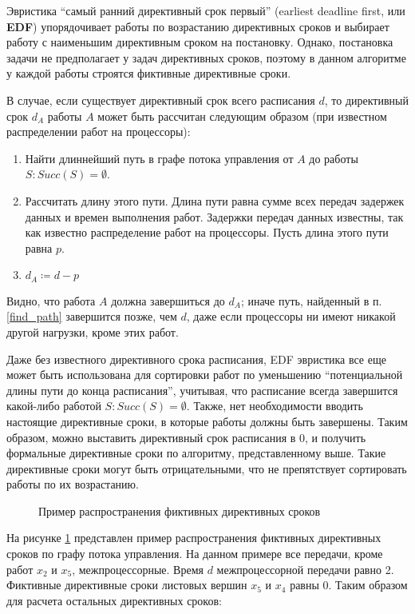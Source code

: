 Эвристика ``самый ранний директивный срок первый'' (earliest deadline first, или \textbf{EDF}) упорядочивает работы по возрастанию директивных сроков и выбирает работу с наименьшим директивным сроком на постановку. Однако, постановка задачи не предполагает у задач директивных сроков, поэтому в данном алгоритме у каждой работы строятся фиктивные директивные сроки.

В случае, если существует директивный срок всего расписания $d$, то директивный срок $d_A$ работы $A$ может быть рассчитан следующим образом (при известном распределении работ на процессоры):
\begin{enumerate}
    \item \label{find_path} Найти длиннейший путь в графе потока управления от $A$ до работы $S: Succ(S) = \emptyset$.
    \item Рассчитать длину этого пути. Длина пути равна сумме всех передач задержек данных и времен выполнения работ. Задержки передач данных известны, так как известно распределение работ на процессоры. Пусть длина этого пути равна $p$.
    \item $d_A \coloneqq d - p$
\end{enumerate}
Видно, что работа $A$ должна завершиться до $d_A$; иначе путь, найденный в п.\ref{find_path} завершится позже, чем $d$, даже если процессоры ни имеют никакой другой нагрузки, кроме этих работ.

Даже без известного директивного срока расписания, EDF эвристика все еще может быть использована для сортировки работ по уменьшению ``потенциальной длины пути  до конца расписания'', учитывая, что расписание всегда завершится какой-либо работой $S : Succ(S) = \emptyset$. Также, нет необходимости вводить настоящие директивные сроки, в которые работы должны быть завершены. Таким образом, можно выставить директивный срок расписания в $0$, и получить формальные директивные сроки по алгоритму, представленному выше. Такие директивные сроки могут быть отрицательными, что не препятствует сортировать работы по их возрастанию.

\begin{figure}[!htbp]
    \caption{Пример распространения фиктивных директивных сроков}
    \label{fig:edf}
\end{figure}

На рисунке \ref{fig:edf} представлен пример распространения фиктивных директивных сроков по графу потока управления. На данном примере все передачи, кроме работ $x_2$ и $x_5$, межпроцессорные. Время $d$ межпроцессорной передачи равно 2. Фиктивные директивные сроки листовых вершин $x_5$ и $x_4$ равны 0. Таким образом для расчета остальных директивных сроков:

